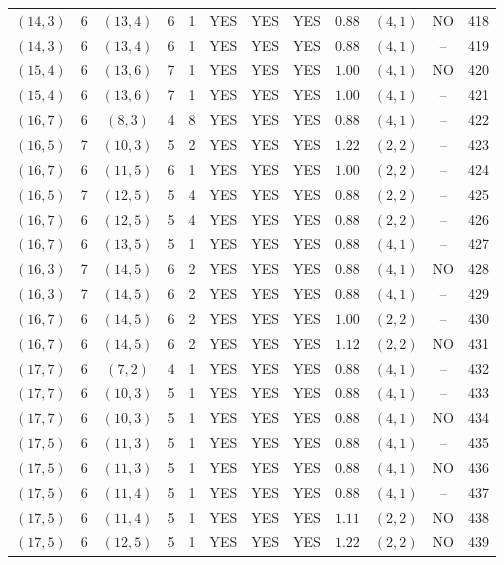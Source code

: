 \begin{longtable}{|c|c|c|c|c|c|c|c|c|c|c|c|}
$(14,3)$ & 6 & $(13,4)$ & 6 & 1 & YES & YES & YES & $0.88$ & $(4,1)$ & NO & 418\\
$(14,3)$ & 6 & $(13,4)$ & 6 & 1 & YES & YES & YES & $0.88$ & $(4,1)$ & -- & 419\\
$(15,4)$ & 6 & $(13,6)$ & 7 & 1 & YES & YES & YES & $1.00$ & $(4,1)$ & NO & 420\\
$(15,4)$ & 6 & $(13,6)$ & 7 & 1 & YES & YES & YES & $1.00$ & $(4,1)$ & -- & 421\\
$(16,7)$ & 6 & $(8,3)$ & 4 & 8 & YES & YES & YES & $0.88$ & $(4,1)$ & -- & 422\\
$(16,5)$ & 7 & $(10,3)$ & 5 & 2 & YES & YES & YES & $1.22$ & $(2,2)$ & -- & 423\\
$(16,7)$ & 6 & $(11,5)$ & 6 & 1 & YES & YES & YES & $1.00$ & $(2,2)$ & -- & 424\\
$(16,5)$ & 7 & $(12,5)$ & 5 & 4 & YES & YES & YES & $0.88$ & $(2,2)$ & -- & 425\\
$(16,7)$ & 6 & $(12,5)$ & 5 & 4 & YES & YES & YES & $0.88$ & $(2,2)$ & -- & 426\\
$(16,7)$ & 6 & $(13,5)$ & 5 & 1 & YES & YES & YES & $0.88$ & $(4,1)$ & -- & 427\\
$(16,3)$ & 7 & $(14,5)$ & 6 & 2 & YES & YES & YES & $0.88$ & $(4,1)$ & NO & 428\\
$(16,3)$ & 7 & $(14,5)$ & 6 & 2 & YES & YES & YES & $0.88$ & $(4,1)$ & -- & 429\\
$(16,7)$ & 6 & $(14,5)$ & 6 & 2 & YES & YES & YES & $1.00$ & $(2,2)$ & -- & 430\\
$(16,7)$ & 6 & $(14,5)$ & 6 & 2 & YES & YES & YES & $1.12$ & $(2,2)$ & NO & 431\\
$(17,7)$ & 6 & $(7,2)$ & 4 & 1 & YES & YES & YES & $0.88$ & $(4,1)$ & -- & 432\\
$(17,7)$ & 6 & $(10,3)$ & 5 & 1 & YES & YES & YES & $0.88$ & $(4,1)$ & -- & 433\\
$(17,7)$ & 6 & $(10,3)$ & 5 & 1 & YES & YES & YES & $0.88$ & $(4,1)$ & NO & 434\\
$(17,5)$ & 6 & $(11,3)$ & 5 & 1 & YES & YES & YES & $0.88$ & $(4,1)$ & -- & 435\\
$(17,5)$ & 6 & $(11,3)$ & 5 & 1 & YES & YES & YES & $0.88$ & $(4,1)$ & NO & 436\\
$(17,5)$ & 6 & $(11,4)$ & 5 & 1 & YES & YES & YES & $0.88$ & $(4,1)$ & -- & 437\\
$(17,5)$ & 6 & $(11,4)$ & 5 & 1 & YES & YES & YES & $1.11$ & $(2,2)$ & NO & 438\\
$(17,5)$ & 6 & $(12,5)$ & 5 & 1 & YES & YES & YES & $1.22$ & $(2,2)$ & NO & 439\\

\end{longtable}
